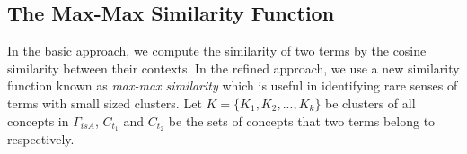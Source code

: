 \subsection{The Max-Max Similarity Function}
%
%
In the basic approach, we compute the similarity of two terms
by the cosine similarity between their contexts. In the
refined approach, we use a new similarity function known as {\em max-max similarity}
which is useful in identifying rare senses of terms with small sized clusters.
Let $K=\{K_1,K_2,...,K_k\}$ be clusters of all concepts in $\Gamma_{isA}$,
$C_{t_1}$ and $C_{t_2}$ be the sets of concepts that two terms belong to
respectively.
